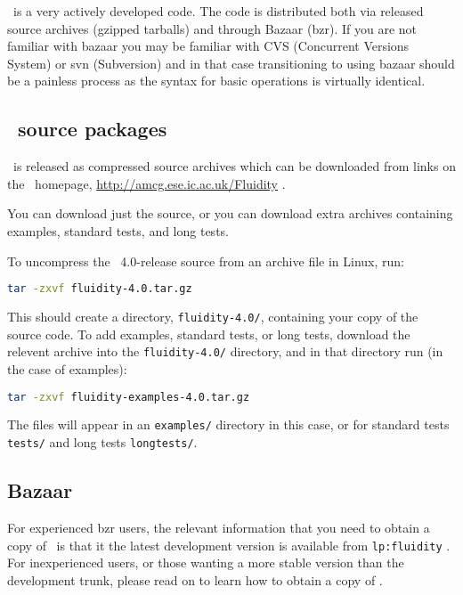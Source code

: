 \fluidity\ is a very actively developed code. The code is distributed both via
released source archives (gzipped tarballs) and through Bazaar (bzr). If you
are not familiar with bazaar you may be familiar with CVS (Concurrent Versions
System) or svn (Subversion) and in that case transitioning to using bazaar
should be a painless process as the syntax for basic operations is virtually
identical.

\subsection{\fluidity\ source packages}

\fluidity\ is released as compressed source archives which can be downloaded
from links on the \fluidity\ homepage,
\href{http://amcg.ese.ic.ac.uk/Fluidity}{http://amcg.ese.ic.ac.uk/Fluidity} .

You can download just the source, or you can download extra archives containing
examples, standard tests, and long tests.

To uncompress the \fluidity\ 4.0-release source from an archive file in Linux,
run:

\begin{lstlisting}[language=Bash]
tar -zxvf fluidity-4.0.tar.gz
\end{lstlisting}

This should create a directory, \lstinline[language=Bash]+fluidity-4.0/+,
containing your copy of the source code. To add examples, standard tests, or
long tests, download the relevent archive into the
\lstinline[language=Bash]+fluidity-4.0/+ directory, and in that directory run
(in the case of examples):

\begin{lstlisting}[language=Bash]
tar -zxvf fluidity-examples-4.0.tar.gz
\end{lstlisting}

The files will appear in an \lstinline[language=Bash]+examples/+ directory in
this case, or for standard tests \lstinline[language=Bash]+tests/+ and long
tests \lstinline[language=Bash]+longtests/+.

\subsection{Bazaar}
\label{sec:bazaar}

For experienced bzr users, the relevant information that you need to
obtain a copy of \fluidity\ is that it the latest development version is
available from
\lstinline[language=Bash]+lp:fluidity+ .  For
inexperienced users, or those wanting a more stable version than the
development trunk, please read on to learn how to obtain a copy of \fluidity.

